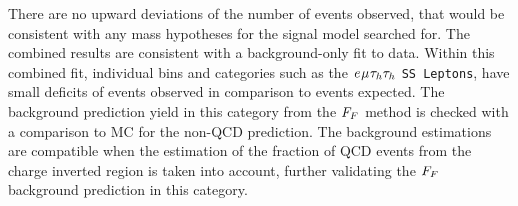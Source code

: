 There are no upward deviations of the number of events observed, that would be consistent with any mass hypotheses for the signal model searched for.
The combined results are consistent with a background-only fit to data.
Within this combined fit, individual bins and categories such as the $e_{}\mu_{}\tau_{h}\tau_{h}$ \texttt{SS Leptons}, have small deficits of events observed in comparison to events expected.
The background prediction yield in this category from the $F_{F}$ method is checked with a comparison to \ac{MC} for the non-\ac{QCD} prediction.
The background estimations are compatible when the estimation of the fraction of \ac{QCD} events from the charge inverted region is taken into account, further validating the $F_{F}$ background prediction in this category.


\begin{figure}[!hbtp]
\centering
     \\

\end{figure}
